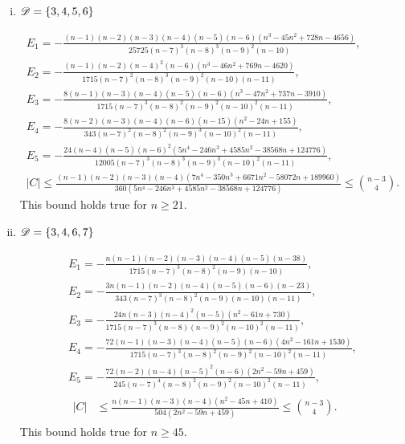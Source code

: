 \documentclass{amsart}
\begin{document}
{\begin{enumerate}[(i)]
\item $\mathscr{D}=\{3,4,5,6\}$

\begin{gather*}
E_1 = -\frac{\left(n - 1\right) \left(n - 2\right) \left(n - 3\right) \left(n - 4\right) \left(n - 5\right) \left(n - 6\right) \left(n^{3} - 45 n^{2} + 728 n - 4656\right)}{25725 \left(n - 7\right)^3 \left(n - 8\right)^{3} \left(n - 9\right)^{2} \left(n - 10\right)}, \\
E_2 = -\frac{\left(n - 1\right) \left(n - 2\right) \left(n - 4\right)^{2} \left(n - 6\right) \left(n^{3} - 46 n^{2} + 769 n - 4620\right)}{1715 \left(n - 7\right)^2 \left(n - 8\right)^3 \left(n - 9\right)^{2} \left(n - 10\right) \left(n - 11\right)}, \\
E_3 = -\frac{8 \left(n - 1\right) \left(n - 3\right) \left(n - 4\right) \left(n - 5\right) \left(n - 6\right) \left(n^{3} - 47 n^{2} + 737 n - 3910\right)}{1715 \left(n - 7\right)^3 \left(n - 8\right)^{2} \left(n - 9\right)^{2} \left(n - 10\right)^{2} \left(n - 11\right)}, \\
E_4 = -\frac{8 \left(n - 2\right) \left(n - 3\right) \left(n - 4\right) \left(n - 6\right) \left(n - 15\right) \left(n^{2} - 24 n + 155\right)}{343 \left(n - 7\right)^2 \left(n - 8\right)^{2} \left(n - 9\right)^{3} \left(n - 10\right)^{2} \left(n - 11\right)}, \\
E_5 = -\frac{24 \left(n - 4\right) \left(n - 5\right) \left(n - 6\right)^2 \left(5 n^{4} - 246 n^{3} + 4585 n^{2} - 38568 n + 124776\right)}{12005 \left(n - 7\right)^3 \left(n - 8\right)^{3} \left(n - 9\right)^{3} \left(n - 10\right)^{2} \left(n - 11\right)}, \\
|C| \leq \frac{\left(n - 1\right) \left(n - 2\right) \left(n - 3\right) \left(n - 4\right) \left(7 n^{4} - 350 n^{3} + 6671 n^{2} - 58072 n + 189960\right)}{360 \left(5 n^{4} - 246 n^{3} + 4585 n^{2} - 38568 n + 124776\right)} \leq \binom{n-3}{4}.
\end{gather*}
This bound holds true for $n \ge 21$.

\item $\mathscr{D}=\{3,4,6,7\}$

\begin{gather*}
E_1=-\frac{n(n-1)(n-2)(n-3)(n-4)(n-5)(n-38)}{1715(n-7)^3(n-8)^2(n-9)(n-10)},\\ 
E_2=-\frac{3n(n-1)(n-2)(n-4)(n-5)(n-6)(n-23)}{343(n-7)^3(n-8)^2(n-9)(n-10)(n-11)},\\
E_3=-\frac{24n(n-3)(n-4)^2(n-5)\left(n^2-61n+730\right)}{1715(n-7)^3(n-8)(n-9)^2(n-10)^2(n-11)},\\
E_4=-\frac{72(n-1)(n-3)(n-4)(n-5)(n-6)\left(4n^2-161n+1530\right)}{1715(n-7)^3(n-8)^2(n-9)^2(n-10)^2(n-11)},\\
E_5=-\frac{72(n-2)(n-4)(n-5)^2(n-6)\left(2n^2-59n+459\right)}{245(n-7)^4(n-8)^2(n-9)^2(n-10)^2(n-11)},\\
\begin{aligned}
|C| &\le \frac{n(n-1)(n-3)(n-4)\left(n^2-45n+410\right)}{504\left(2n^2-59n+459\right)} \leq \binom{n-3}{4}.
\end{aligned}
\end{gather*}
This bound holds true for $n\ge 45.$


\end{enumerate}}
\end{document}
